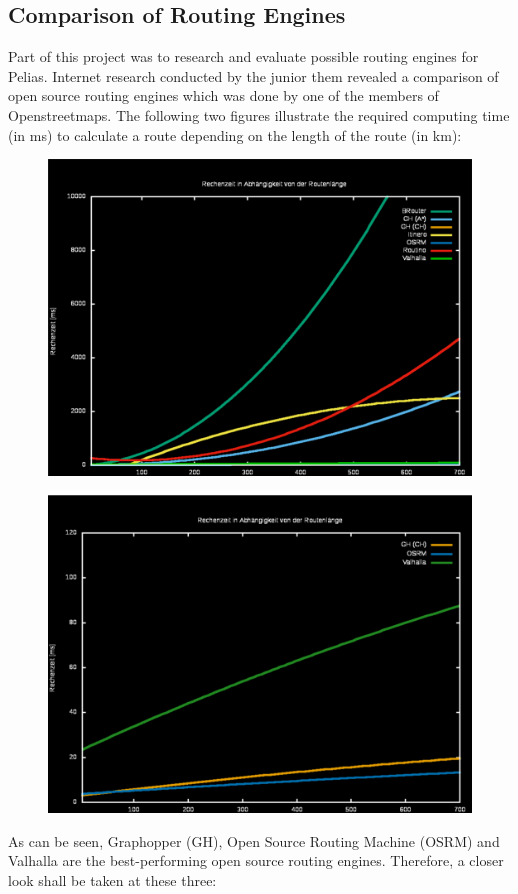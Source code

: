 \subsection{Comparison of Routing Engines}
Part of this project was to research and evaluate possible routing engines for Pelias. Internet research conducted by the junior them revealed a comparison of open source routing engines which was done by one of the members of Openstreetmaps. The following two figures illustrate the required computing time (in ms) to calculate a route depending on the length of the route (in km)\citep{Ramm2017}:
\begin{figure}[H]
\centering
\includegraphics[width=1.0\textwidth]{img/routing_comparison_01}
\label{fig:routing_comparison_01}
\end{figure}
\begin{figure}[H]
\centering
\includegraphics[width=1.0\textwidth]{img/routing_comparison_02}
\label{fig:routing_comparison_02}
\end{figure}
As can be seen, Graphopper (GH), Open Source Routing Machine (OSRM) and Valhalla are the best-performing open source routing engines. Therefore, a closer look shall be taken at these three:


